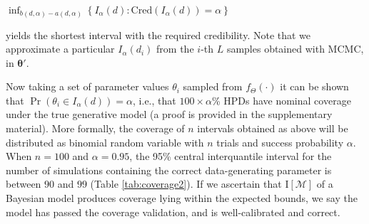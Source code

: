 \documentclass[oneside]{article}
\begin{document}
\begin{center}
  \hspace{0cm}
  $\inf_{b(d, \alpha)-a(d, \alpha)} \left \{ I_\alpha(d) : \text{Cred}(I_\alpha(d)) = \alpha \right\}$
\end{center}

\noindent yields the shortest interval with the required credibility.
Note that we approximate a particular $I_\alpha(d_i)$ from the $i$-th $L$ samples obtained with MCMC, in $\boldsymbol{\theta}'$.

Now taking a set of parameter values $\theta_i$ sampled from $f_\Theta(\cdot)$
it can be shown that
$\operatorname{Pr}\left(\theta_i \in I_\alpha(d) \right) = \alpha$, i.e., that $100\times\alpha$\% HPDs have nominal coverage under the true generative model (a proof is provided in the supplementary material).
More formally, the coverage of $n$ intervals obtained as above will be distributed as binomial random variable with $n$ trials and success probability $\alpha$.
When $n=100$ and $\alpha = 0.95$, the 95\% central interquantile interval for the number of simulations containing the correct data-generating parameter is between $90$ and $99$ (Table \ref{tab:coverage2}).
If we ascertain that $\text{I}[\mathcal{M}]$ of a Bayesian model produces coverage lying within the expected bounds, we say the model has passed the coverage validation, and is well-calibrated and correct.
\end{document}
